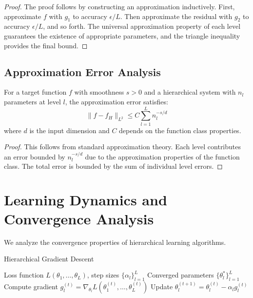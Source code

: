 \begin{proof}
The proof follows by constructing an approximation inductively. First, approximate $f$ with $g_1$ to accuracy $\epsilon/L$. Then approximate the residual with $g_2$ to accuracy $\epsilon/L$, and so forth. The universal approximation property of each level guarantees the existence of appropriate parameters, and the triangle inequality provides the final bound.
\end{proof}

\subsection{Approximation Error Analysis}

\begin{theorem}
\label{thm:hierarchical_approximation_bounds}
For a target function $f$ with smoothness $s > 0$ and a hierarchical system with $n_l$ parameters at level $l$, the approximation error satisfies:
$$\|f - f_H\|_{L^2} \leq C \sum_{l=1}^L n_l^{-s/d}$$
where $d$ is the input dimension and $C$ depends on the function class properties.
\end{theorem}

\begin{proof}
This follows from standard approximation theory. Each level contributes an error bounded by $n_l^{-s/d}$ due to the approximation properties of the function class. The total error is bounded by the sum of individual level errors.
\end{proof}

\section{Learning Dynamics and Convergence Analysis}

We analyze the convergence properties of hierarchical learning algorithms.

\begin{algorithm}
\caption{Hierarchical Gradient Descent}
\begin{algorithmic}[1]
\Require Loss function $L(\theta_1, \ldots, \theta_L)$, step sizes $\{\alpha_l\}_{l=1}^L$
\Ensure Converged parameters $\{\theta_l^*\}_{l=1}^L$
        \State Compute gradient $g_l^{(t)} = \nabla_{\theta_l} L(\theta_1^{(t)}, \ldots, \theta_L^{(t)})$
        \State Update $\theta_l^{(t+1)} = \theta_l^{(t)} - \alpha_l g_l^{(t)}$
    \EndFor
\EndFor
\end{algorithmic}
\end{algorithm}

